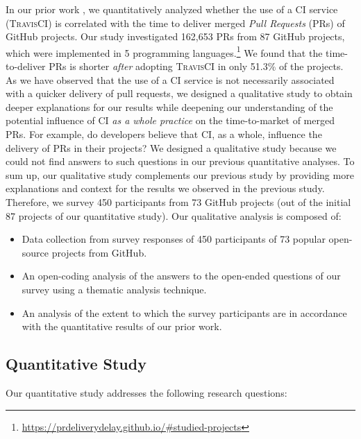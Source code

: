In our prior work \citep{bernardo2018studying}, we quantitatively analyzed whether the use of a CI service (\textsc{TravisCI}) is correlated with the
time to deliver merged {\em Pull Requests} (PRs) of GitHub projects.
Our study investigated 162,653 PRs from 87 GitHub projects, which were implemented in 5 programming languages.\footnote{\url{https://prdeliverydelay.github.io/\#studied-projects}} We found that the time-to-deliver PRs is shorter \textit{after} adopting \textsc{TravisCI} in only 51.3\% of the projects. As we have observed that the use of a CI service is not necessarily associated with a quicker delivery of pull requests, we designed a qualitative study to obtain deeper explanations for our results while deepening our understanding of the potential influence of CI {\em as a whole practice} on the time-to-market of merged PRs. For example, do developers believe that CI, as a whole, influence the delivery of PRs in their projects? We designed a qualitative study because we could not find answers to such questions in our previous quantitative analyses. To sum up, our qualitative study complements our previous study by providing more explanations and context for the results we observed in the previous study.
Therefore, we survey 450 participants from 73 GitHub projects (out of the initial 87 projects of our quantitative study). 
Our qualitative analysis is composed of:

\begin{itemize}
    \item Data collection from survey responses of 450 participants of 73 popular open-source projects from GitHub. 
    \item An open-coding analysis of the answers to the open-ended questions of our survey using a thematic analysis technique.
    \item An analysis of the extent to which the survey participants are in accordance with the quantitative results of our prior work.
\end{itemize}

\subsection{\textbf{Quantitative Study}}

Our quantitative study addresses the following
research questions:

